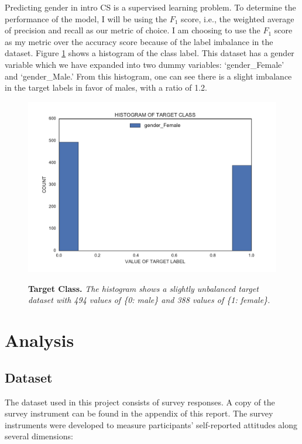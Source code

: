Predicting gender in intro CS is a supervised learning problem. To determine the performance of the model, I will be using the $F_1$ score, i.e., the weighted average of precision and recall as our metric of choice. I am choosing to use the $F_1$ score as my metric over the accuracy score because of the label imbalance in the dataset. Figure \ref{targetClass} shows a histogram of the class label. This dataset has a gender variable which we have expanded into two dummy variables: `gender\_Female' and `gender\_Male.' From this histogram, one can see there is a slight imbalance in the target labels in favor of males, with a ratio of 1.2.

\begin{figure}[!hbtp]
\centering

    \caption{\textbf{Target Class. }\textit{The histogram shows a slightly unbalanced target dataset with 494 values of \{0: male\} and 388 values of \{1: female\}.}}

    \includegraphics[width=1\textwidth]{figures/targetClass}
    \label{targetClass}
\end{figure}


\chapter*{Analysis}

\section* {Dataset}
The dataset used in this project consists of survey responses. A copy of the survey instrument can be found in the appendix of this report. The survey instruments were developed to measure participants' self-reported attitudes along several dimensions: 

